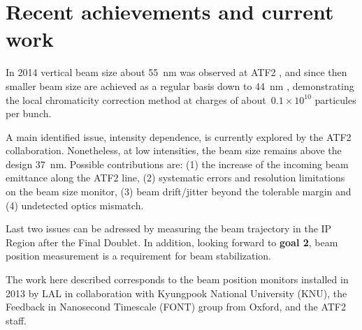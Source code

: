 \section{Recent achievements and current work}
In 2014 vertical beam size about 55~nm was observed at ATF2 \cite{Kubo50nm}, and since then smaller beam size are achieved as a regular basis down to 44~nm \cite{KuboCLICws2015}, demonstrating the local chromaticity correction method at charges of about~$0.1\times10^{10}$ particules per bunch.\par
A main identified issue, intensity dependence, is currently explored by the ATF2 collaboration. Nonetheless, at low intensities, the beam size remains above the design 37~nm. Possible contributions are: (1) the increase of the incoming beam emittance along the ATF2 line, (2) systematic errors and resolution limitations on the beam size monitor, (3) beam drift/jitter beyond the tolerable margin and  (4) undetected optics mismatch.\par
Last two issues can be adressed by measuring the beam trajectory in the IP Region after the Final Doublet. In addition, looking forward to \textbf{goal 2}, beam position measurement is a requirement for beam stabilization.\par
The work here described corresponds to the beam position monitors installed in 2013 by LAL in collaboration with Kyungpook National University (KNU), the Feedback in Nanosecond Timescale (FONT) group from Oxford, and the ATF2 staff.\par


